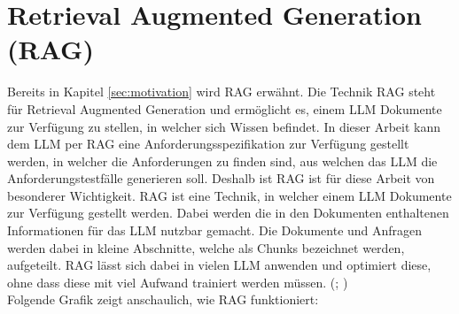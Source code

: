 \documentclass[12pt,toc=bib,toc=listof]{scrreprt}
\begin{document}
\section{Retrieval Augmented Generation (RAG)} %
\label{sec:rag}
Bereits in Kapitel \ref{sec:motivation} wird RAG erwähnt. Die Technik RAG steht für Retrieval Augmented Generation und ermöglicht es, einem LLM Dokumente zur Verfügung zu stellen, in welcher sich Wissen befindet. In dieser Arbeit kann dem LLM per RAG eine Anforderungsspezifikation zur Verfügung gestellt werden, in welcher die Anforderungen zu finden sind, aus welchen das LLM die Anforderungstestfälle generieren soll. Deshalb ist RAG ist für diese Arbeit von besonderer Wichtigkeit. RAG ist eine Technik, in welcher einem LLM Dokumente zur Verfügung gestellt werden. Dabei werden die in den Dokumenten enthaltenen Informationen für das LLM nutzbar gemacht. Die Dokumente und Anfragen werden dabei in kleine Abschnitte, welche als Chunks bezeichnet werden, aufgeteilt. RAG lässt sich dabei in vielen LLM anwenden und optimiert diese, ohne dass diese mit viel Aufwand trainiert werden müssen. (\cite{Gao2024}; \cite{Wu2024})\\
\newpage
\noindent Folgende Grafik zeigt anschaulich, wie RAG funktioniert:
\end{document}
